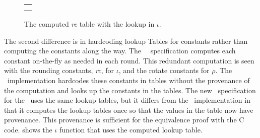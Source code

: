 \begin{figure}[t]
  \begin{center}
    \begin{tabular}{l}
      \usebox{\cryciota} \\ \\
    \end{tabular}
  \end{center}
  \caption{The computed \emph{rc} table with the lookup in $\iota$.}
  \label{fig:iota}
\end{figure}

The second difference is in hardcoding lookup Tables for constants rather than computing the constants along the way.
The \fips\ \cryptol\ specification computes each constant on-the-fly as needed in each round.
This redundant computation is seen with the rounding constants, \emph{rc}, for $\iota$, and the rotate constants for $\rho$. 
The \openssl\ implementation hardcodes these constants in tables without the provenance of the computation and looks up the constants in the tables.
The new \cryptol\ specification for the \openssl\ uses the same lookup tables, but it differs from the \openssl\ implementation in that it computes the lookup tables once so that the values in the table now have provenance.
This provenance is sufficient for the equivalence proof with the C code.
 shows the $\iota$ function that uses the computed lookup table.
